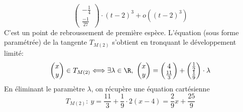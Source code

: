 {\begin{enumerate}
{$$\begin{pmatrix}-\frac{1}{4}\\ \frac{-1}{27}\end{pmatrix}\cdot (t-2)^3+o((t-2)^3)$$
C'est un point de rebroussement de première espèce. L'équation (sous forme paramétrée) de la tangente $T_{M(2)}$ s'obtient en tronquant le développement limité:
$$\begin{pmatrix}x\\ y\end{pmatrix}\in T_{M(2)}
\Longleftrightarrow\exists\lambda\in\R,\ \begin{pmatrix}x \\ y\end{pmatrix}
=\begin{pmatrix}4\\  \frac{11}{3}\end{pmatrix}+
\begin{pmatrix}\frac{1}{2}\\\frac{1}{9}\end{pmatrix}\cdot \lambda$$
En éliminant le paramètre $\lambda$, on récupère une équation cartésienne 
$$T_{M(2)}:\ y=\frac{11}{3}+\frac{1}{9}\cdot 2(x-4)=\frac{2}{9}x+\frac{25}{9}$$
}
\end{enumerate}
}
